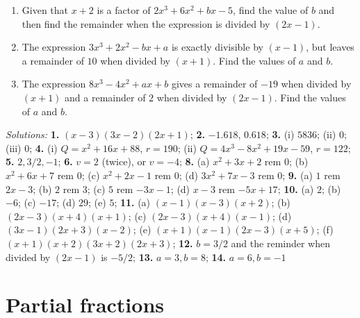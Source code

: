 \documentclass[
  english,
  12pt,
  oneside]{book}
\providecommand{\tightlist}{%
  \setlength{\itemsep}{0pt}\setlength{\parskip}{0pt}}
\theoremstyle{definition}
\theoremstyle{definition}
\theoremstyle{definition}
\theoremstyle{definition}
\theoremstyle{remark}
\begin{document}
\begin{enumerate}
  \begin{enumerate}
  \def\labelenumii{\alph{enumii})}
  \tightlist
  \item
    \(x^3 - 2x^2 - 5x + 6\)
  \item
    \(2x^3 + 7x^2 - 7x - 12\)
  \item
    \(2x^3 + 3x^2 - 17x + 12\)
  \item
    \(6x^3 - 5x^2 - 17x + 6\)
  \item
    \(2x^4 + 7x^3 - 17x^2 -7x + 15\)
  \item
    \(6x^4 + 31x^3 + 57x^2 + 44x + 12\)
  \end{enumerate}
\item
  Given that \(x + 2\) is a factor of \(2x^3 + 6x^2 + bx - 5\), find the value of \(b\) and then find the remainder when the expression is divided by \((2x - 1)\).
\item
  The expression \(3x^3 + 2x^2 - bx + a\) is exactly divisible by \((x - 1)\), but leaves a remainder of \(10\) when divided by \((x + 1)\). Find the values of \(a\) and \(b\).
\item
  The expression \(8x^3 - 4x^2 + ax + b\) gives a remainder of \(-19\) when divided by \((x + 1)\) and a remainder of \(2\) when divided by \((2x - 1)\). Find the values of \(a\) and \(b\).
\end{enumerate}

\emph{Solutions:}
\textbf{1.} \((x-3)(3x-2)(2x+1)\);
\textbf{2.} \(-1.618\), \(0.618\);
\textbf{3.} (i) \(5836\); (ii) \(0\); (iii) \(0\);
\textbf{4.} (i) \(Q=x^2+16x+88\), \(r=190\); (ii) \(Q=4x^3-8x^2+19x-59\), \(r=122\);
\textbf{5.} \(2,3/2,-1\);
\textbf{6.} \(v=2\) (twice), or \(v=-4\);
\textbf{8.} (a) \(x^2+3x+2\) rem \(0\); (b) \(x^2+6x+7\) rem \(0\); (c) \(x^2+2x-1\) rem \(0\); (d) \(3x^2+7x-3\) rem \(0\);
\textbf{9.} (a) \(1\) rem \(2x-3\); (b) \(2\) rem \(3\); (c) \(5\) rem \(-3x-1\); (d) \(x-3\) rem \(-5x+17\);
\textbf{10.} (a) \(2\); (b) \(-6\); (c) \(-17\); (d) \(29\); (e) \(5\);
\textbf{11.} (a) \((x -1)(x - 3)(x + 2)\); (b) \((2x - 3)(x + 4)(x + 1)\); (c) \((2x - 3)(x + 4)(x - 1)\); (d) \((3x - 1)(2x + 3)(x - 2)\); (e) \((x + 1)(x - 1)(2x - 3)(x + 5)\); (f) \((x + 1)(x + 2)(3x + 2)(2x + 3)\);
\textbf{12.} \(b = 3/2\) and the reminder when divided by \((2x-1)\) is \(-5/2\);
\textbf{13.} \(a=3, b=8\);
\textbf{14.} \(a=6,b=-1\)

\chapter{Partial fractions}\label{partial-fractions}
\end{document}
